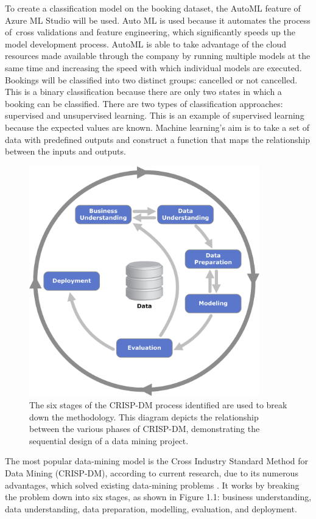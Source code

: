 To create a classification model on the booking dataset, the AutoML feature of Azure ML Studio will be used. Auto ML is used because it automates the process of cross validations and feature engineering, which significantly speeds up the model development process. AutoML is able to take advantage of the cloud resources made available through the company by running multiple models at the same time and increasing the speed with which individual models are executed. Bookings will be classified into two distinct groups: cancelled or not cancelled. This is a binary classification because there are only two states in which a booking can be classified. There are two types of classification approaches: supervised and unsupervised learning. This is an example of supervised learning because the expected values are known. Machine learning's aim is to take a set of data with predefined outputs and construct a function that maps the relationship between the inputs and outputs.

 \begin{figure}[H]
 \centering
 \includegraphics[width=10cm]{figures/CRISPDM_Process_Diagram.png}
 \caption{The six stages of the CRISP-DM process identified are used to break down the methodology. This diagram depicts the relationship between the various phases of CRISP-DM, demonstrating the sequential design of a data mining project.}
\end{figure} 


The most popular data-mining model is the Cross Industry Standard Method for Data Mining (CRISP-DM), according to current research, due to its numerous advantages, which solved existing data-mining problems \cite{Wirth2000CRISP-DMMining}. It works by breaking the problem down into six stages, as shown in Figure 1.1: business understanding, data understanding, data preparation, modelling, evaluation, and deployment.

